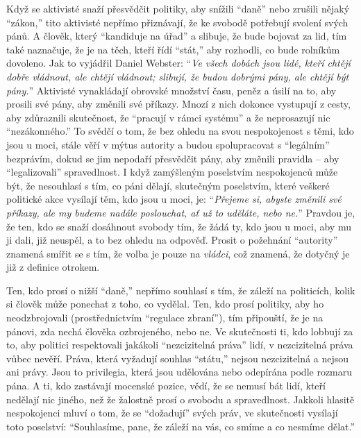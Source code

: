 \documentclass{book}
\begin{document}
Když se aktivisté snaží přesvědčit politiky, aby snížili \enquote{daně} nebo zrušili nějaký \enquote{zákon,} tito aktivisté nepřímo přiznávají, že ke svobodě potřebují svolení svých pánů. A člověk, který \enquote{kandiduje na úřad} a slibuje, že bude bojovat za lid, tím také naznačuje, že je na těch, kteří řídí \enquote{stát,} aby rozhodli, co bude rolníkům dovoleno. Jak to vyjádřil Daniel Webster: \enquote{\emph{Ve všech dobách jsou lidé, kteří chtějí dobře vládnout, ale chtějí vládnout; slibují, že budou dobrými pány, ale chtějí být pány.}} Aktivisté vynakládají obrovské množství času, peněz a úsilí na to, aby prosili své pány, aby změnili své příkazy. Mnozí z nich dokonce vystupují z cesty, aby zdůraznili skutečnost, že \enquote{pracují v rámci systému} a že neprosazují nic \enquote{nezákonného.} To svědčí o tom, že bez ohledu na svou nespokojenost s těmi, kdo jsou u moci, stále věří v mýtus autority a budou spolupracovat s \enquote{legálním} bezprávím, dokud se jim nepodaří přesvědčit pány, aby změnili pravidla -- aby \enquote{legalizovali} spravedlnost. I když zamýšleným poselstvím nespokojenců může být, že nesouhlasí s tím, co páni dělají, skutečným poselstvím, které veškeré politické akce vysílají těm, kdo jsou u moci, je: \enquote{\emph{Přejeme si, abyste změnili své příkazy, ale my budeme nadále poslouchat, ať už to uděláte, nebo ne.}} Pravdou je, že ten, kdo se snaží dosáhnout svobody tím, že žádá ty, kdo jsou u moci, aby mu ji dali, již neuspěl, a to bez ohledu na odpověď. Prosit o požehnání \enquote{autority} znamená smířit se s tím, že volba je pouze na \emph{vládci}, což znamená, že dotyčný je již z definice otrokem.

Ten, kdo prosí o nižší \enquote{daně,} nepřímo souhlasí s tím, že záleží na politicích, kolik si člověk může ponechat z toho, co vydělal. Ten, kdo prosí politiky, aby ho neodzbrojovali (prostřednictvím \enquote{regulace zbraní}), tím připouští, že je na pánovi, zda nechá člověka ozbrojeného, nebo ne. Ve skutečnosti ti, kdo lobbují za to, aby politici respektovali jakákoli \enquote{nezcizitelná práva} lidí, v nezcizitelná práva vůbec nevěří. Práva, která vyžadují souhlas \enquote{státu,} nejsou nezcizitelná a nejsou ani právy. Jsou to privilegia, která jsou udělována nebo odepírána podle rozmaru pána. A ti, kdo zastávají mocenské pozice, vědí, že se nemusí bát lidí, kteří nedělají nic jiného, než že žalostně prosí o svobodu a spravedlnost. Jakkoli hlasitě nespokojenci mluví o tom, že se \enquote{dožadují} svých práv, ve skutečnosti vysílají toto poselství: \enquote{Souhlasíme, pane, že záleží na vás, co smíme a co nesmíme dělat.}
\end{document}

